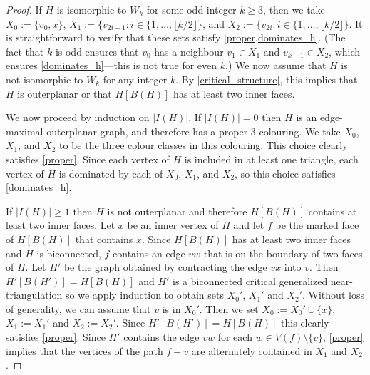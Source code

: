 \documentclass[12pt]{article}
\theoremstyle{definition}
\begin{document}
\begin{proof}
  If $H$ is isomorphic to $W_k$ for some odd integer $k\ge 3$, then we take $X_0:=\{v_0, x\}$, $X_1:=\{v_{2i-1}:i\in\{1,\ldots,\lfloor k/2\rfloor\}$, and $X_2:=\{v_{2i}:i\in\{1,\ldots,\lfloor k/2\rfloor\}$.  It is straightforward to verify that these sets satisfy \cref{proper,dominates_h}.  (The fact that $k$ is odd ensures that $v_0$ has a neighbour $v_1\in X_1$ and $v_{k-1}\in X_2$, which ensures \cref{dominates_h}---this is not true for even $k$.)   We now assume that $H$ is not isomorphic to $W_k$ for any integer $k$.  By \cref{critical_structure}, this implies that $H$ is outerplanar or that $H[B(H)]$ has at least two inner faces.

  We now proceed by induction on $|I(H)|$.  If $|I(H)|=0$ then $H$ is an edge-maximal outerplanar graph, and therefore has a proper $3$-colouring.  We take $X_0$, $X_1$, and $X_2$ to be the three colour classes in this colouring.  This choice clearly satisfies \cref{proper}. Since each vertex of $H$ is included in at least one triangle, each vertex of $H$ is dominated by each of $X_0$, $X_1$, and $X_2$, so this choice satisfies \cref{dominates_h}.

  If $|I(H)|\ge 1$ then $H$ is not outerplanar and therefore $H[B(H)]$ contains at least two inner faces.  Let $x$ be an inner vertex of $H$ and let $f$ be the marked face of $H[B(H)]$ that contains $x$.
  Since $H[B(H)]$ has at least two inner faces and $H$ is biconnected, $f$ contains an edge $vw$ that is on the boundary of two faces of $H$.  Let $H'$ be the graph obtained by contracting the edge $vx$ into $v$. Then $H'[B(H')]=H[B(H)]$ and $H'$ is a biconnected critical generalized near-triangulation so we apply induction to obtain sets $X_0'$, $X_1'$ and $X_2'$.  Without loss of generality, we can assume that $v$ is in $X_0'$.  Then we set $X_0:=X_0'\cup\{x\}$, $X_1:=X_1'$ and $X_2:=X_2'$. Since $H'[B(H')]=H[B(H)]$ this clearly satisfies \cref{proper}.  Since $H'$ contains the edge $vw$ for each $w\in V(f)\setminus\{v\}$, \cref{proper} implies that the vertices of the path $f-v$ are alternately contained in $X_1$ and $X_2$.


\end{proof}
\end{document}
